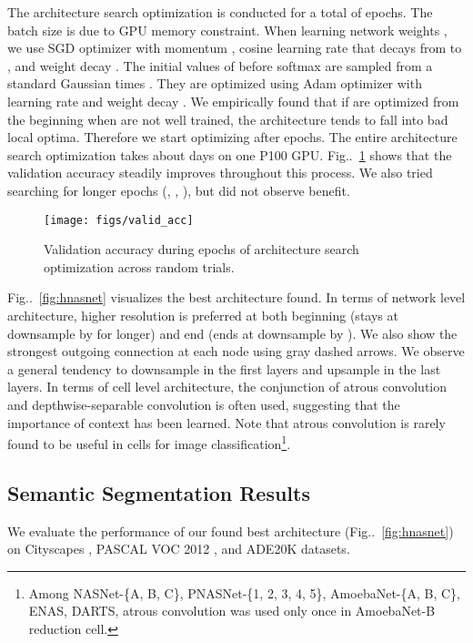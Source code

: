 \documentclass[10pt,twocolumn,letterpaper]{article}
\makeatletter
\def\@onedot{\ifx\@let@token.\else.\null\fi\xspace}
\DeclareRobustCommand\onedot{\futurelet\@let@token\@onedot}
\newcommand{\figref}[1]{Fig\onedot~\ref{#1}}
\makeatother
\begin{document}
The architecture search optimization is conducted for a total of  epochs.
The batch size is  due to GPU memory constraint.
When learning network weights , we use SGD optimizer with momentum , cosine learning rate that decays from  to , and weight decay .
The initial values of  before softmax are sampled from a standard Gaussian times . 
They are optimized using Adam optimizer \cite{KingmaB14} with learning rate  and weight decay .
We empirically found that if  are optimized from the beginning when  are not well trained, the architecture tends to fall into bad local optima. 
Therefore we start optimizing  after  epochs.
The entire architecture search optimization takes about  days on one P100 GPU.
\figref{fig:valid_acc} shows that the validation accuracy steadily improves throughout this process.
We also tried searching for longer epochs (, , ), but did not observe benefit.

\begin{figure}[t]
    \centering
    \texttt{[image: figs/valid\_acc]}
    \vspace{-0.2cm}
    \caption{Validation accuracy during  epochs of architecture search optimization across  random trials. }
    \label{fig:valid_acc}
\end{figure}

\figref{fig:hnasnet} visualizes the best architecture found.
In terms of network level architecture, higher resolution is preferred at both beginning (stays at downsample by  for longer) and end (ends at downsample by ).
We also show the strongest outgoing connection at each node using gray dashed arrows. 
We observe a general tendency to downsample in the first  layers and upsample in the last  layers.
In terms of cell level architecture, the conjunction of atrous convolution and depthwise-separable convolution is often used, suggesting that the importance of context has been learned.
Note that atrous convolution is rarely found to be useful in cells for image classification\footnote{Among NASNet-\{A, B, C\}, PNASNet-\{1, 2, 3, 4, 5\}, AmoebaNet-\{A, B, C\}, ENAS, DARTS, atrous convolution was used only once in AmoebaNet-B reduction cell.}.


\subsection{Semantic Segmentation Results}
We evaluate the performance of our found best architecture (\figref{fig:hnasnet}) on Cityscapes \cite{Cordts2016Cityscapes}, PASCAL VOC 2012 \cite{everingham2014pascal}, and ADE20K \cite{zhou2017scene} datasets.
\end{document}
